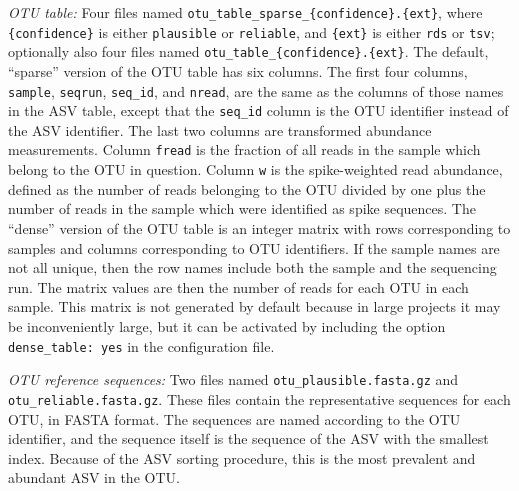 \documentclass[
]{article}
\begin{document}
\emph{OTU table:} Four files named \texttt{otu\_table\_sparse\_\{confidence\}.\{ext\}}, where \texttt{\{confidence\}} is either \texttt{plausible} or \texttt{reliable}, and \texttt{\{ext\}} is either \texttt{rds} or \texttt{tsv};
optionally also four files named \texttt{otu\_table\_\{confidence\}.\{ext\}}.
The default, ``sparse'' version of the OTU table has six columns.
The first four columns, \texttt{sample}, \texttt{seqrun}, \texttt{seq\_id}, and \texttt{nread}, are the same as the columns of those names in the ASV table, except that the \texttt{seq\_id} column is the OTU identifier instead of the ASV identifier.
The last two columns are transformed abundance measurements.
Column \texttt{fread} is the fraction of all reads in the sample which belong to the OTU in question.
Column \texttt{w} is the spike-weighted read abundance, defined as the number of reads belonging to the OTU divided by one plus the number of reads in the sample which were identified as spike sequences.
The ``dense'' version of the OTU table is an integer matrix with rows corresponding to samples and columns corresponding to OTU identifiers.
If the sample names are not all unique, then the row names include both the sample and the sequencing run.
The matrix values are then the number of reads for each OTU in each sample.
This matrix is not generated by default because in large projects it may be inconveniently large, but it can be activated by including the option \texttt{dense\_table:\ yes} in the configuration file.

\emph{OTU reference sequences:} Two files named \texttt{otu\_plausible.fasta.gz} and \texttt{otu\_reliable.fasta.gz}.
These files contain the representative sequences for each OTU, in FASTA format.
The sequences are named according to the OTU identifier, and the sequence itself is the sequence of the ASV with the smallest index.
Because of the ASV sorting procedure, this is the most prevalent and abundant ASV in the OTU.
\end{document}
